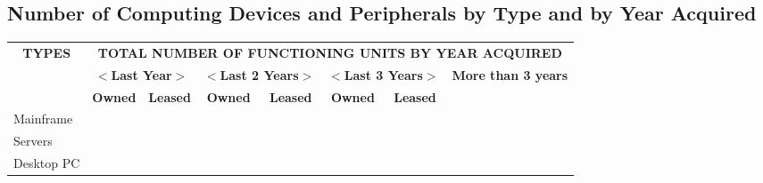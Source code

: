 \documentclass[a4paper,10pt, total={10.95in, 8in}]{article} %
\begin{document}
\subsection{Number of Computing Devices and Peripherals by Type and by Year Acquired}
\begin{table}[H]
\renewcommand{\arraystretch}{1.5}
\centering
\begin{adjustbox}{width=6in}
\begin{tabular}{|p{6.5cm}|lllllll|}
\hline
\multicolumn{1}{|c|}{\multirow{3}{*}{\textbf{TYPES}}}              & \multicolumn{7}{c|}{\textbf{TOTAL NUMBER OF FUNCTIONING UNITS BY YEAR ACQUIRED}}                                                                                                                                                                                                                        \\ \cline{2-8} 
\multicolumn{1}{|c|}{}                                             & \multicolumn{2}{c|}{\textbf{$<$Last Year$>$}}                                  & \multicolumn{2}{c|}{\textbf{$<$Last 2 Years$>$}}                               & \multicolumn{2}{c|}{\textbf{$<$Last 3 Years$>$}}                               & \multicolumn{1}{c|}{\multirow{2}{*}{\textbf{More than 3 years}}} \\ \cline{2-7}
\multicolumn{1}{|c|}{}                                             & \multicolumn{1}{c|}{\textbf{Owned}} & \multicolumn{1}{c|}{\textbf{Leased}} & \multicolumn{1}{c|}{\textbf{Owned}} & \multicolumn{1}{c|}{\textbf{Leased}} & \multicolumn{1}{c|}{\textbf{Owned}} & \multicolumn{1}{c|}{\textbf{Leased}} & \multicolumn{1}{c|}{}                                            \\ \hline
Mainframe                                                          & \multicolumn{1}{l|}{}               & \multicolumn{1}{l|}{}                & \multicolumn{1}{l|}{}               & \multicolumn{1}{l|}{}                & \multicolumn{1}{l|}{}               & \multicolumn{1}{l|}{}                &                                                                  \\ \hline
Servers                                                            & \multicolumn{1}{l|}{}               & \multicolumn{1}{l|}{}                & \multicolumn{1}{l|}{}               & \multicolumn{1}{l|}{}                & \multicolumn{1}{l|}{}               & \multicolumn{1}{l|}{}                &                                                                  \\ \hline
Desktop PC                                                         & \multicolumn{1}{l|}{}               & \multicolumn{1}{l|}{}                & \multicolumn{1}{l|}{}               & \multicolumn{1}{l|}{}                & \multicolumn{1}{l|}{}               & \multicolumn{1}{l|}{}                &                                                                  \\ \hline

\end{tabular}
\end{adjustbox}
\end{table}
\end{document}
